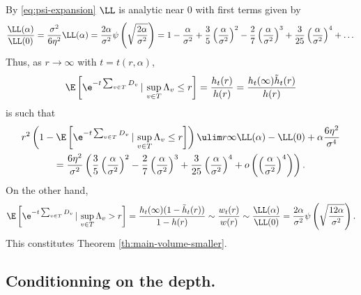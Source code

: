 \documentclass[10pt,a4paper]{article}
\begin{document}
By \eqref{eq:psi-expansion} $\LL$ is analytic near $0$ with first terms given by 
\[ \frac{\LL(\alpha)}{\LL(0)} = \frac{\sigma^2}{6\eta^2}\LL(\alpha) = \frac{2\alpha}{\sigma^2}\psi\left(\sqrt{\frac{2\alpha}{\sigma^2}}\right) %
= 1 - \frac{\alpha}{\sigma^2} + \frac{3}{5}\left(\frac{\alpha}{\sigma^2}\right)^2 - \frac{2}{7}\left(\frac{\alpha}{\sigma^2}\right)^3 + \frac{3}{25}\left(\frac{\alpha}{\sigma^2}\right)^4 + \dots 
\]
Thus, as $r\to\infty$ with $t=t(r,\alpha)$, 
\[ \E\left[ \e^{-t\sum_{v\in T} D_v} \, | \, \sup_{v\in T} \Lambda_v \leq r \right] = \frac{h_t(r)}{h(r)} = \frac{h_t(\infty) \tilde h_t(r)}{h(r)} \]
is such that
\begin{multline*}
r^2\left( 1 - \E\left[ \e^{-t\sum_{v\in T} D_v} \, | \, \sup_{v\in T} \Lambda_v \leq r \right]\right) \ulim r \infty \LL(\alpha) - \LL(0) + \alpha \frac{6\eta^2}{\sigma^4} \\
= \frac{6\eta^2}{\sigma^2} \left(\frac{3}{5}\left(\frac{\alpha}{\sigma^2}\right)^2 - \frac{2}{7}\left(\frac{\alpha}{\sigma^2}\right)^3 + \frac{3}{25}\left(\frac{\alpha}{\sigma^2}\right)^4 + o\left( \left(\frac{\alpha}{\sigma^2}\right)^4\right) \right) . 
\end{multline*} 
On the other hand, 
\[ \E\left[ \e^{-t\sum_{v\in T} D_v} \, | \, \sup_{v\in T} \Lambda_v > r \right] = \frac{h_t(\infty)(1-\tilde h_t(r))}{1-h(r)} \sim \frac{w_t(r)}{w(r)} \sim \frac{\LL(\alpha)}{\LL(0)} = \frac{2\alpha}{\sigma^2}\psi\left( \sqrt{\frac{12\alpha}{\sigma^2}} \right) . \]
This constitutes Theorem \ref{th:main-volume-smaller}.







\subsection{Conditionning on the depth.}


\end{document}
